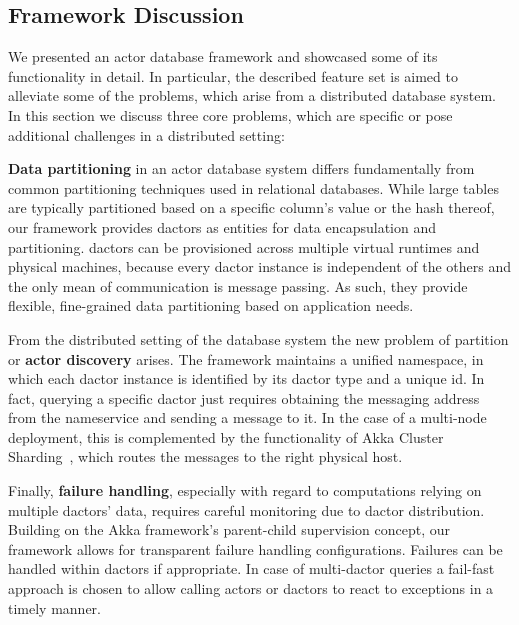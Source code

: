   \subsection{Framework Discussion}\label{subsec:framework_discussion}
    We presented an actor database framework and showcased some of its functionality in detail.
    In particular, the described feature set is aimed to alleviate some of the problems, which arise from a distributed database system.
    In this section we discuss three core problems, which are specific or pose additional challenges in a distributed setting:
    
    \textbf{Data partitioning} in an actor database system differs fundamentally from common partitioning techniques used in relational databases.
    While large tables are typically partitioned based on a specific column's value or the hash thereof, our framework provides \glspl{dactor} as entities for data encapsulation and partitioning.
    \Glspl{dactor} can be provisioned across multiple virtual runtimes and physical machines, because every \gls{dactor} instance is independent of the others and the only mean of communication is message passing.
    As such, they provide flexible, fine-grained data partitioning based on application needs.
    
    From the distributed setting of the database system the new problem of partition or \textbf{actor discovery} arises.
    The framework maintains a unified namespace, in which each \gls{dactor} instance is identified by its \gls{dactor} type and a unique id.
    In fact, querying a specific \gls{dactor} just requires obtaining the messaging address from the nameservice and sending a message to it.
    In the case of a multi-node deployment, this is complemented by the functionality of Akka Cluster Sharding~\cite{akka:clustersharding}, which routes the messages to the right physical host.
    
    Finally, \textbf{failure handling}, especially with regard to computations relying on multiple \glspl{dactor}' data, requires careful monitoring due to \gls{dactor} distribution.
    Building on the Akka framework's parent-child supervision concept, our framework allows for transparent failure handling configurations.
    Failures can be handled within \glspl{dactor} if appropriate.
    In case of multi-\gls{dactor} queries a fail-fast approach is chosen to allow calling actors or \glspl{dactor} to react to exceptions in a timely manner.
